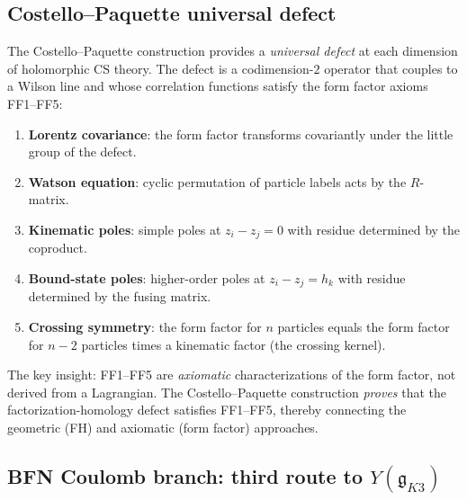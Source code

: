 \documentclass[11pt]{article}
\newcommand{\fg}{\mathfrak{g}}
\begin{document}
\subsection{Costello--Paquette universal defect}
\label{subsec:costello-paquette}

\begin{observation}
\label{obs:costello-paquette-defect}
The Costello--Paquette construction provides a \emph{universal defect}
at each dimension of holomorphic CS theory. The defect is a
codimension-$2$ operator that couples to a Wilson line and whose
correlation functions satisfy the form factor axioms FF1--FF5:
\begin{enumerate}[label=\textup{FF\arabic*:}]
 \item \textbf{Lorentz covariance}: the form factor transforms
 covariantly under the little group of the defect.
 \item \textbf{Watson equation}: cyclic permutation of particle
 labels acts by the $R$-matrix.
 \item \textbf{Kinematic poles}: simple poles at $z_i - z_j = 0$
 with residue determined by the coproduct.
 \item \textbf{Bound-state poles}: higher-order poles at $z_i - z_j = h_k$
 with residue determined by the fusing matrix.
 \item \textbf{Crossing symmetry}: the form factor for $n$ particles
 equals the form factor for $n - 2$ particles times a kinematic
 factor (the crossing kernel).
\end{enumerate}
The key insight: FF1--FF5 are \emph{axiomatic} characterizations of
the form factor, not derived from a Lagrangian. The Costello--Paquette
construction \emph{proves} that the factorization-homology defect
satisfies FF1--FF5, thereby connecting the geometric (FH) and
axiomatic (form factor) approaches.
\end{observation}

\subsection{BFN Coulomb branch: third route to $Y(\fg_{K3})$}
\label{subsec:bfn-coulomb}
\end{document}
